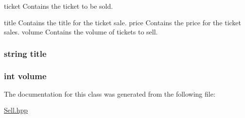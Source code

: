 ticket Contains the ticket to be sold. 

title Contains the title for the ticket sale. price Contains the price for the ticket sales. volume Contains the volume of tickets to sell. \hypertarget{class_sell_a43a5eafe64b96968035e5a4013e47c75}{
\subsubsection[{title}]{\setlength{\rightskip}{0pt plus 5cm}string title\hspace{0.3cm}{\ttfamily [private]}}}\label{class_sell_a43a5eafe64b96968035e5a4013e47c75}
\hypertarget{class_sell_aed48ca0bcd2162fd4fd495873e2631f5}{
\subsubsection[{volume}]{\setlength{\rightskip}{0pt plus 5cm}int volume\hspace{0.3cm}{\ttfamily [private]}}}\label{class_sell_aed48ca0bcd2162fd4fd495873e2631f5}


The documentation for this class was generated from the following file\-:\begin{DoxyCompactItemize}
\item 
\hyperlink{_sell_8hpp}{Sell.\-hpp}\end{DoxyCompactItemize}
